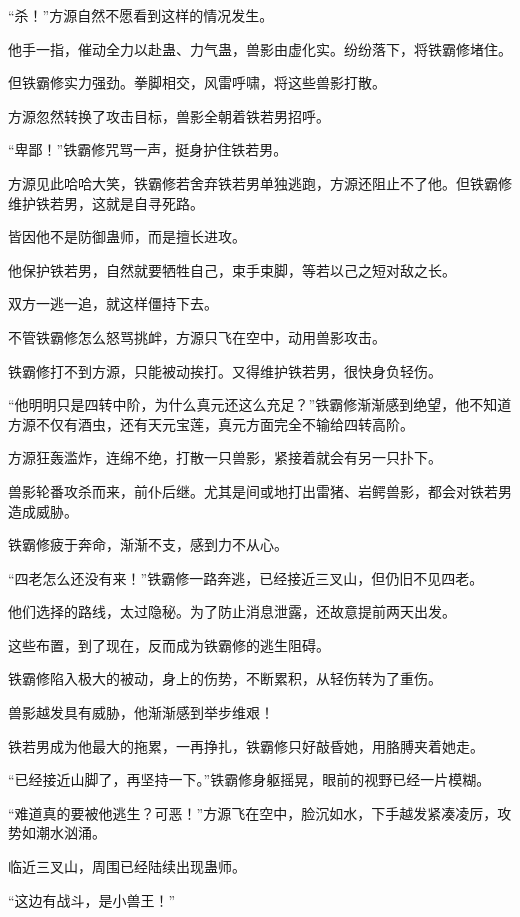 \begin{this_body}
“杀！”方源自然不愿看到这样的情况发生。

他手一指，催动全力以赴蛊、力气蛊，兽影由虚化实。纷纷落下，将铁霸修堵住。

但铁霸修实力强劲。拳脚相交，风雷呼啸，将这些兽影打散。

方源忽然转换了攻击目标，兽影全朝着铁若男招呼。

“卑鄙！”铁霸修咒骂一声，挺身护住铁若男。

方源见此哈哈大笑，铁霸修若舍弃铁若男单独逃跑，方源还阻止不了他。但铁霸修维护铁若男，这就是自寻死路。

皆因他不是防御蛊师，而是擅长进攻。

他保护铁若男，自然就要牺牲自己，束手束脚，等若以己之短对敌之长。

双方一逃一追，就这样僵持下去。

不管铁霸修怎么怒骂挑衅，方源只飞在空中，动用兽影攻击。

铁霸修打不到方源，只能被动挨打。又得维护铁若男，很快身负轻伤。

“他明明只是四转中阶，为什么真元还这么充足？”铁霸修渐渐感到绝望，他不知道方源不仅有酒虫，还有天元宝莲，真元方面完全不输给四转高阶。

方源狂轰滥炸，连绵不绝，打散一只兽影，紧接着就会有另一只扑下。

兽影轮番攻杀而来，前仆后继。尤其是间或地打出雷猪、岩鳄兽影，都会对铁若男造成威胁。

铁霸修疲于奔命，渐渐不支，感到力不从心。

“四老怎么还没有来！”铁霸修一路奔逃，已经接近三叉山，但仍旧不见四老。

他们选择的路线，太过隐秘。为了防止消息泄露，还故意提前两天出发。

这些布置，到了现在，反而成为铁霸修的逃生阻碍。

铁霸修陷入极大的被动，身上的伤势，不断累积，从轻伤转为了重伤。

兽影越发具有威胁，他渐渐感到举步维艰！

铁若男成为他最大的拖累，一再挣扎，铁霸修只好敲昏她，用胳膊夹着她走。

“已经接近山脚了，再坚持一下。”铁霸修身躯摇晃，眼前的视野已经一片模糊。

“难道真的要被他逃生？可恶！”方源飞在空中，脸沉如水，下手越发紧凑凌厉，攻势如潮水汹涌。

临近三叉山，周围已经陆续出现蛊师。

“这边有战斗，是小兽王！”


\end{this_body}

